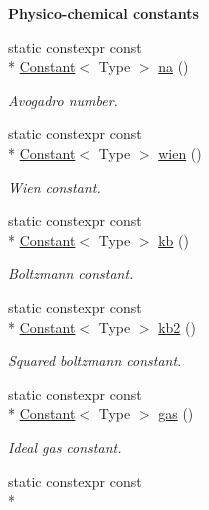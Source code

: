 \begin{Indent}{\bf Physico-\/chemical constants}\par
\begin{DoxyCompactItemize}
\item 
static constexpr const \\*
\hyperlink{exceptionmagrathea_1_1Constant}{Constant}$<$ Type $>$ \hyperlink{exceptionmagrathea_1_1Constants_acc8c48d517a5d78798884b48eb6a145b}{na} ()
\begin{DoxyCompactList}\small\item\em Avogadro number. \end{DoxyCompactList}\item 
static constexpr const \\*
\hyperlink{exceptionmagrathea_1_1Constant}{Constant}$<$ Type $>$ \hyperlink{exceptionmagrathea_1_1Constants_a5115839e19a4b79e3d365d3b0a6a530b}{wien} ()
\begin{DoxyCompactList}\small\item\em Wien constant. \end{DoxyCompactList}\item 
static constexpr const \\*
\hyperlink{exceptionmagrathea_1_1Constant}{Constant}$<$ Type $>$ \hyperlink{exceptionmagrathea_1_1Constants_a999399a7fe759fe2bc203cd818b061f3}{kb} ()
\begin{DoxyCompactList}\small\item\em Boltzmann constant. \end{DoxyCompactList}\item 
static constexpr const \\*
\hyperlink{exceptionmagrathea_1_1Constant}{Constant}$<$ Type $>$ \hyperlink{exceptionmagrathea_1_1Constants_a7b70f60fe4d8dae986ed2c83d2ea6188}{kb2} ()
\begin{DoxyCompactList}\small\item\em Squared boltzmann constant. \end{DoxyCompactList}\item 
static constexpr const \\*
\hyperlink{exceptionmagrathea_1_1Constant}{Constant}$<$ Type $>$ \hyperlink{exceptionmagrathea_1_1Constants_a95659b0cccd205cc6301bdb25428fbaf}{gas} ()
\begin{DoxyCompactList}\small\item\em Ideal gas constant. \end{DoxyCompactList}\item 
static constexpr const \\*

\end{DoxyCompactItemize}
\end{Indent}
